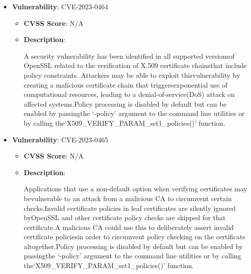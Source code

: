 \documentclass{article}
\begin{document}
\begin{itemize}
        \item \textbf{Vulnerability}: CVE-2023-0464
        \begin{itemize}
            \item \textbf{CVSS Score}:  N/A 
            \item \textbf{Description}:
            \parbox[t]{0.9\linewidth}{
                \ttfamily A security vulnerability has been identified in all supported versionsof OpenSSL related to the verification of X.509 certificate chainsthat include policy constraints.  Attackers may be able to exploit thisvulnerability by creating a malicious certificate chain that triggersexponential use of computational resources, leading to a denial-of-service(DoS) attack on affected systems.Policy processing is disabled by default but can be enabled by passingthe `-policy' argument to the command line utilities or by calling the`X509\_VERIFY\_PARAM\_set1\_policies()' function.
            }
        \end{itemize}
    
        \item \textbf{Vulnerability}: CVE-2023-0465
        \begin{itemize}
            \item \textbf{CVSS Score}:  N/A 
            \item \textbf{Description}:
            \parbox[t]{0.9\linewidth}{
                \ttfamily Applications that use a non-default option when verifying certificates may bevulnerable to an attack from a malicious CA to circumvent certain checks.Invalid certificate policies in leaf certificates are silently ignored byOpenSSL and other certificate policy checks are skipped for that certificate.A malicious CA could use this to deliberately assert invalid certificate policiesin order to circumvent policy checking on the certificate altogether.Policy processing is disabled by default but can be enabled by passingthe `-policy' argument to the command line utilities or by calling the`X509\_VERIFY\_PARAM\_set1\_policies()' function.
            }
        \end{itemize}
    

\end{itemize}
\end{document}
